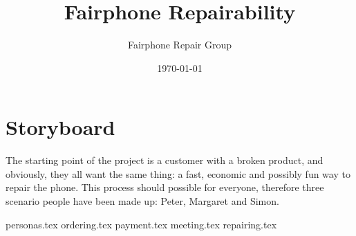 \documentclass[final,a4paper]{report} %
\author{Fairphone Repair Group}
\title{Fairphone Repairability}
\date{\today}
\begin{document}
	\chapter{Storyboard}
	\label{ch:storyboard}
	The starting point of the project is a customer with a broken product, and obviously, they all want the same thing: a fast, economic and possibly fun way to repair the phone. This process should possible for everyone, therefore three scenario people have been made up: Peter, Margaret and Simon.
	
	{personas.tex}
	{ordering.tex}
	{payment.tex}
	{meeting.tex}
	{repairing.tex}
\end{document}
